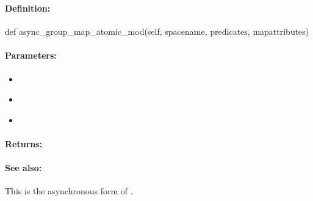 \pagebreak
\subsubsection{}
\label{api:python:async_group_map_atomic_mod}


\paragraph{Definition:}
\begin{pythoncode}
def async_group_map_atomic_mod(self, spacename, predicates, mapattributes)
\end{pythoncode}

\paragraph{Parameters:}
\begin{itemize}[noitemsep]
\item {}\\

\item {}\\

\item {}\\

\end{itemize}

\paragraph{Returns:}


\paragraph{See also:}  This is the asynchronous form of .

\pagebreak
\subsubsection{}
\label{api:python:map_atomic_and}


